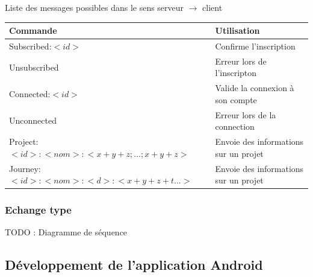     \begin{center}
        Liste des messages possibles dans le sens serveur $\rightarrow$ client
        \par
        \begin{tabular}{|l|l|}
            \hline
            Commande & Utilisation\\
            \hline
            Subscribed:$<id>$ & Confirme l'inscription \\
            \hline
            Unsubscribed & Erreur lors de l'inscripton \\
            \hline
            Connected:$<id>$ & Valide la connexion à son compte\\
            \hline
            Unconnected & Erreur lors de la connection \\
            \hline
            \hline
            Project:$<id>:<nom>:<x+y+z;...;x+y+z>$ & Envoie des informations sur un projet\\
            \hline
            Journey:$<id>:<nom>:<d>:<x+y+z+t...>$ & Envoie des informations sur un projet\\
            \hline
        \end{tabular}
    \end{center}

  \subsubsection{Echange type}
    TODO : Diagramme de séquence

\subsection{Développement de l'application Android}
